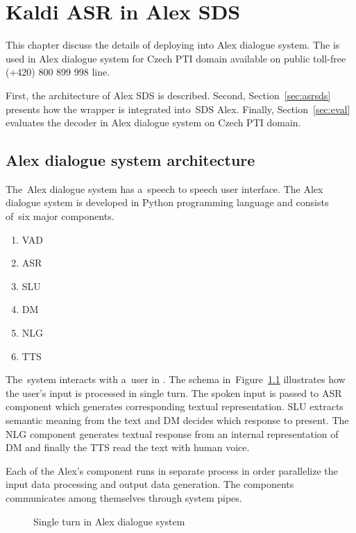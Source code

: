 \chapter{Kaldi \acs{ASR} in Alex \acs{SDS}}
\label{cha:integration}

This chapter discuss the details of deploying  into Alex dialogue system.
The  is used in Alex dialogue system for Czech \acf{PTI} domain available on public toll-free (+420) 800 899 998 line.

First, the architecture of Alex \acf{SDS} is described.
Second, Section~\ref{sec:asrsds} presents how the wrapper  is integrated into~\ac{SDS} Alex.
Finally, Section~\ref{sec:eval} evaluates the decoder in Alex dialogue system on Czech \ac{PTI} domain. 

\section{Alex dialogue system architecture} 
\label{sec:arch}

The~Alex dialogue system has a~speech to speech user interface. 
The Alex dialogue system is developed in Python programming language and consists of~six major components. 
\begin{enumerate}
    \item \acf{VAD} 
    \item \acf{ASR}
    \item \acf{SLU}
    \item \acf{DM}
    \item \acf{NLG}
    \item \acf{TTS}
\end{enumerate}
The~system interacts with a~user in . 
The schema in~Figure~\ref{fig:alex} illustrates how the user's input is processed in single turn.
The spoken input is passed to \ac{ASR} component which generates corresponding textual representation.
\ac{SLU} extracts semantic meaning from the text and \ac{DM} decides which response to present.
The \ac{NLG} component generates textual response from an internal representation of \ac{DM} and finally the \ac{TTS} read the text with human voice.

Each of the Alex's component runs in separate process in order parallelize the input data processing and output data generation.
The components communicates among themselves through system pipes.

\begin{figure}
    \begin{center}
    
    \caption{Single turn in Alex dialogue system}
    \label{fig:alex} 
    \end{center}
\end{figure}

